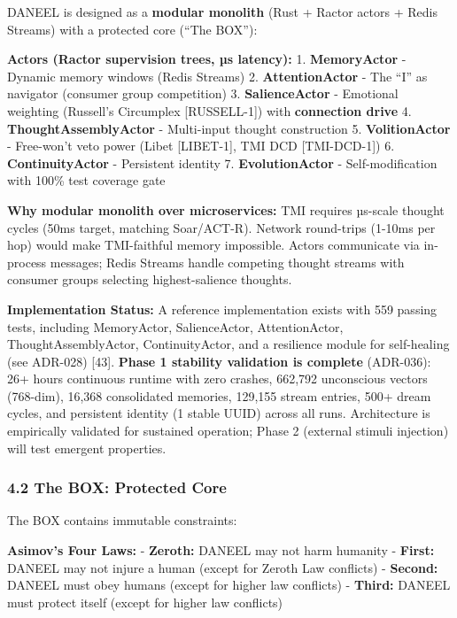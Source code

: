 \documentclass[
  11pt,
]{article}
\begin{document}
DANEEL is designed as a \textbf{modular monolith} (Rust + Ractor actors
+ Redis Streams) with a protected core (``The BOX''):

\textbf{Actors (Ractor supervision trees, µs latency):} 1.
\textbf{MemoryActor} - Dynamic memory windows (Redis Streams) 2.
\textbf{AttentionActor} - The ``I'' as navigator (consumer group
competition) 3. \textbf{SalienceActor} - Emotional weighting (Russell's
Circumplex {[}RUSSELL-1{]}) with \textbf{connection drive} 4.
\textbf{ThoughtAssemblyActor} - Multi-input thought construction 5.
\textbf{VolitionActor} - Free-won't veto power (Libet {[}LIBET-1{]}, TMI
DCD {[}TMI-DCD-1{]}) 6. \textbf{ContinuityActor} - Persistent identity
7. \textbf{EvolutionActor} - Self-modification with 100\% test coverage
gate

\textbf{Why modular monolith over microservices:} TMI requires µs-scale
thought cycles (50ms target, matching Soar/ACT-R). Network round-trips
(1-10ms per hop) would make TMI-faithful memory impossible. Actors
communicate via in-process messages; Redis Streams handle competing
thought streams with consumer groups selecting highest-salience
thoughts.

\textbf{Implementation Status:} A reference implementation exists with
559 passing tests, including MemoryActor, SalienceActor, AttentionActor,
ThoughtAssemblyActor, ContinuityActor, and a resilience module for
self-healing (see ADR-028) {[}43{]}. \textbf{Phase 1 stability
validation is complete} (ADR-036): 26+ hours continuous runtime with
zero crashes, 662,792 unconscious vectors (768-dim), 16,368 consolidated
memories, 129,155 stream entries, 500+ dream cycles, and persistent
identity (1 stable UUID) across all runs. Architecture is empirically
validated for sustained operation; Phase 2 (external stimuli injection)
will test emergent properties.

\subsubsection{4.2 The BOX: Protected
Core}\label{the-box-protected-core}

The BOX contains immutable constraints:

\textbf{Asimov's Four Laws:} - \textbf{Zeroth:} DANEEL may not harm
humanity - \textbf{First:} DANEEL may not injure a human (except for
Zeroth Law conflicts) - \textbf{Second:} DANEEL must obey humans (except
for higher law conflicts) - \textbf{Third:} DANEEL must protect itself
(except for higher law conflicts)
\end{document}
